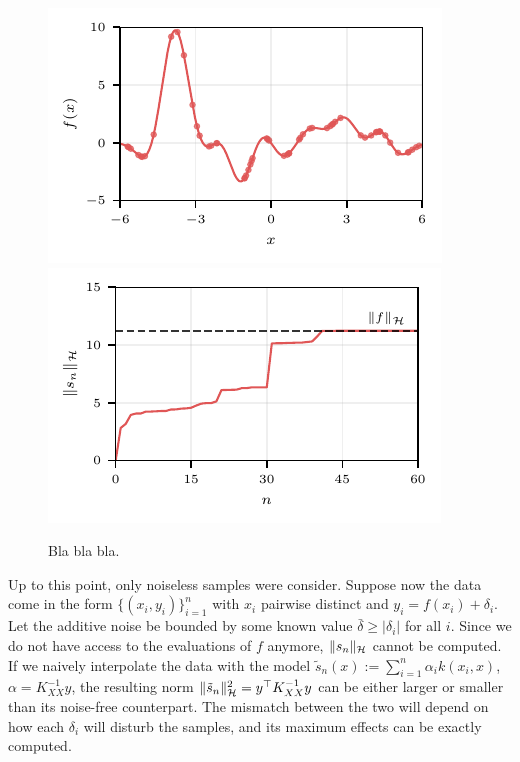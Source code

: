 \begin{figure}[b]
	\centering
	\includegraphics[scale=1]{../images/norm_est.pdf} 
	\includegraphics[scale=1]{../images/norm_value.pdf} %
	\caption{Bla bla bla.}
	\label{fig.appendice_norm_estimation}
\end{figure}


Up to this point, only noiseless samples were consider. Suppose now the data come in the form $\{(x_i,y_i)\}_{i=1}^n$ with $x_i$ pairwise distinct and $y_i=f(x_i) + \delta_i$. Let the additive noise be bounded by some known value $\bar \delta \geq |\delta_i|$ for all $i$. Since we do not have access to the evaluations of $f$ anymore, $\Vert s_n \Vert_{\mathcal{H}}$ cannot be computed. If we naively interpolate the data with the model $\tilde s_n(x) := \sum_{i=1}^n \alpha_i k(x_i,x)$, $\alpha = K_{XX}^{-1} y$, the resulting norm $\Vert \tilde s_n \Vert_{\mathcal{H}}^2 = y^\top K_{XX}^{-1}y$ can be either larger or smaller than its noise-free counterpart. The mismatch between the two will depend on how each $\delta_i$ will disturb the samples, and its maximum effects can be exactly computed.

